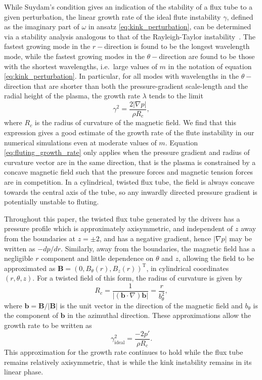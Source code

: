 \documentclass[fleqn,usenatbib]{mnras}
\newcommand{\rev}[1]{{\color{red} {#1}}}
\renewcommand{\vec}[1]{{\bm #1}}
\begin{document}
While Suydam's condition gives an indication of the stability of a flux tube to
a given perturbation, the linear growth rate of the ideal flute instability
$\gamma$, \rev{defined as the imaginary part of $\omega$ in ansatz
  \eqref{eq:kink_perturbation},} can be \rev{determined} via a stability analysis
  analogous to that of the Rayleigh-Taylor
  instability~\citep[][]{goldstonIntroductionPlasmaPhysics2020}.
 \rev{The fastest growing mode in the $r-$direction is found to be the longest
wavelength mode, while the fastest growing modes in the $\theta-$direction
are found to be those with the shortest wavelengths, i.e.~large values of $m$ in
the notation of equation \eqref{eq:kink_perturbation}. In particular, for
all modes with wavelengths in the $\theta-$direction that are shorter
than both the pressure-gradient scale-length and the radial height
of the plasma, the growth rate $\lambda$ tends to the limit}  
\begin{equation}
  \label{eq:fluting_growth_rate}
\gamma^2 = \frac{2|\nabla p|}{\rho R_c},
\end{equation}
where $R_c$ is the radius of curvature of the magnetic field.
\rev{We find that this expression gives a good
  estimate of the growth rate of the flute instability in our
  numerical simulations even at moderate values of $m$.} 
Equation \eqref{eq:fluting_growth_rate}
only applies when the pressure gradient and radius of curvature vector are in
the same direction, that is the plasma is constrained by a concave magnetic
field such that the pressure forces and magnetic tension forces are in
competition. In a cylindrical, twisted flux tube, the field is always concave
towards the central axis of the tube, so any inwardly directed pressure
gradient is potentially unstable to fluting.

Throughout this paper, the twisted flux tube generated by the drivers has
a pressure profile which is approximately axisymmetric, and independent of $z$
away from the boundaries at $z=\pm2$, and has a negative gradient, hence
$|\nabla p|$ may be written as $-d p/ dr$. Similarly, away from the boundaries,
the magnetic field has a negligible $r$ component and little dependence on
$\theta$ and $z$, allowing the field to be approximated as $\vec{B} = (0,
B_{\theta}(r), B_z(r))^{\text{T}}$, in cylindrical coordinates $(r, \theta,
z)$. For a twisted field of this form, the radius of curvature is given by
\begin{equation} \label{eq:radius_of_curvature} R_c
= \frac{1}{|(\vec{b}\cdot\nabla) \vec{b}|} = \frac{r}{b_{\theta}^2},
\end{equation} where $\vec{b} = \vec{B}/|\vec{B}|$ is the unit vector in the
direction of the magnetic field and $b_{\theta}$ is the component of $\vec{b}$
in the azimuthal direction. \rev{These approximations allow} the growth rate to be
written as
\begin{equation}
\label{eq:fluting_growth_rate2}
\gamma_{\text{ideal}}^2 = \frac{-2p'}{\rho R_c}.
\end{equation}
This approximation for the growth rate continues to hold while the flux tube
remains relatively axisymmetric, that is while the kink instability remains in
its linear phase.
\end{document}

